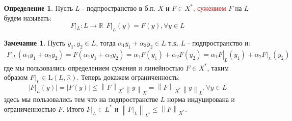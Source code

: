 \documentclass[12pt,a4paper]{article}
\theoremstyle{definition}
\newtheorem{definition}{Определение}[section]
\newtheorem{corollarydf}{Замечание}[definition]
\newcommand{\Real}{\mathbb{R}}
\newcommand{\norm}[1]{\left\lVert#1\right\rVert}
\newcommand{\linear}[2]{\textrm{L}(#1, #2)}
\begin{document}
\begin{definition}
	Пусть $L$ - подпространство в б.п. $X$ и $F \in X^*$, \textcolor{red}{сужением} $F$ на $L$ будем называть:
	\begin{equation*}
		F|_L : L \to \Real \ \ F|_L (y) = F(y), \forall y \in L
	\end{equation*}
\end{definition}
\begin{corollarydf}\label{corll:3}
	Пусть $y_1, y_2 \in L$, тогда $\alpha_1 y_1 + \alpha_2 y_2 \in L$ т.к. $L$ - подпространство и:
	\begin{multline*}
		F|_L (\alpha_1 y_1 + \alpha_2 y_2) = F(\alpha_1 y_1 + \alpha_2 y_2) = \alpha_1 F(y_1) + \alpha_2 F(y_2) = \alpha_1 F|_L (y_1) + \alpha_2 F|_L (y_2)
	\end{multline*}
	где мы пользовались определением сужения и линейностью $F \in X^*$, таким образом $F|_L \in \linear{L}{\Real}$. Теперь докажем ограниченность:
	$$|F|_L (y)| = |F(y)| \leq \norm{F}_{X^*} \norm{y}_{X} = \norm{F}_{X^*} \norm{y}_L, \forall y \in L$$
	здесь мы пользовались тем что на подпространстве $L$ норма индуцирована и ограниченностью $F$. Итого $F|_L \in L^*$ и $\norm{F|_L}_{L^*} \leq \norm{F}_{X^*}$. 
\end{corollarydf}
\end{document}
